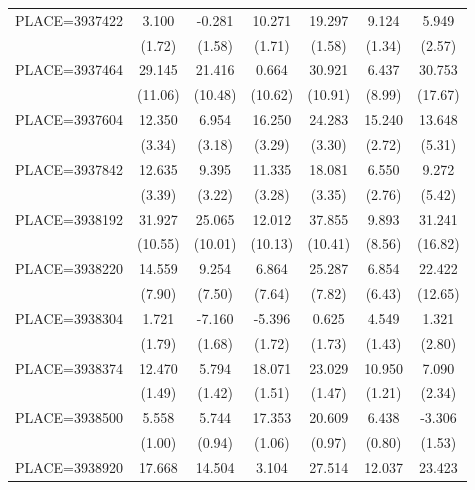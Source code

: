 {\begin{tabular}{l*{6}{c}}
PLACE=3937422       &       3.100&      -0.281&      10.271&      19.297&       9.124&       5.949\\
                    &      (1.72)&      (1.58)&      (1.71)&      (1.58)&      (1.34)&      (2.57)\\
PLACE=3937464       &      29.145&      21.416&       0.664&      30.921&       6.437&      30.753\\
                    &     (11.06)&     (10.48)&     (10.62)&     (10.91)&      (8.99)&     (17.67)\\
PLACE=3937604       &      12.350&       6.954&      16.250&      24.283&      15.240&      13.648\\
                    &      (3.34)&      (3.18)&      (3.29)&      (3.30)&      (2.72)&      (5.31)\\
PLACE=3937842       &      12.635&       9.395&      11.335&      18.081&       6.550&       9.272\\
                    &      (3.39)&      (3.22)&      (3.28)&      (3.35)&      (2.76)&      (5.42)\\
PLACE=3938192       &      31.927&      25.065&      12.012&      37.855&       9.893&      31.241\\
                    &     (10.55)&     (10.01)&     (10.13)&     (10.41)&      (8.56)&     (16.82)\\
PLACE=3938220       &      14.559&       9.254&       6.864&      25.287&       6.854&      22.422\\
                    &      (7.90)&      (7.50)&      (7.64)&      (7.82)&      (6.43)&     (12.65)\\
PLACE=3938304       &       1.721&      -7.160&      -5.396&       0.625&       4.549&       1.321\\
                    &      (1.79)&      (1.68)&      (1.72)&      (1.73)&      (1.43)&      (2.80)\\
PLACE=3938374       &      12.470&       5.794&      18.071&      23.029&      10.950&       7.090\\
                    &      (1.49)&      (1.42)&      (1.51)&      (1.47)&      (1.21)&      (2.34)\\
PLACE=3938500       &       5.558&       5.744&      17.353&      20.609&       6.438&      -3.306\\
                    &      (1.00)&      (0.94)&      (1.06)&      (0.97)&      (0.80)&      (1.53)\\
PLACE=3938920       &      17.668&      14.504&       3.104&      27.514&      12.037&      23.423\\

\end{tabular}}
